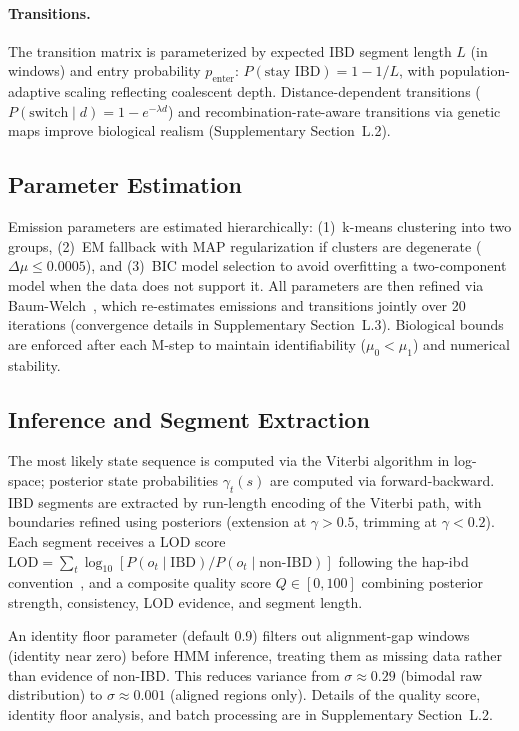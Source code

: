 \paragraph{Transitions.}
The transition matrix is parameterized by expected IBD segment length $L$ (in windows) and entry probability $p_{\text{enter}}$: $P(\text{stay IBD}) = 1 - 1/L$, with population-adaptive scaling reflecting coalescent depth. Distance-dependent transitions ($P(\text{switch} \mid d) = 1 - e^{-\lambda d}$) and recombination-rate-aware transitions via genetic maps improve biological realism (Supplementary Section~L.2).

\subsection{Parameter Estimation}

Emission parameters are estimated hierarchically: (1)~k-means clustering into two groups, (2)~EM fallback with MAP regularization if clusters are degenerate ($\Delta\mu \leq 0.0005$), and (3)~BIC model selection to avoid overfitting a two-component model when the data does not support it. All parameters are then refined via Baum-Welch~\cite{baum1970maximization}, which re-estimates emissions and transitions jointly over 20 iterations (convergence details in Supplementary Section~L.3). Biological bounds are enforced after each M-step to maintain identifiability ($\mu_0 < \mu_1$) and numerical stability.

\subsection{Inference and Segment Extraction}

The most likely state sequence is computed via the Viterbi algorithm in log-space; posterior state probabilities $\gamma_t(s)$ are computed via forward-backward. IBD segments are extracted by run-length encoding of the Viterbi path, with boundaries refined using posteriors (extension at $\gamma > 0.5$, trimming at $\gamma < 0.2$). Each segment receives a LOD score $\text{LOD} = \sum_{t} \log_{10} [P(o_t \mid \text{IBD}) / P(o_t \mid \text{non-IBD})]$ following the hap-ibd convention~\cite{browning2020hap_ibd}, and a composite quality score $Q \in [0, 100]$ combining posterior strength, consistency, LOD evidence, and segment length.

An identity floor parameter (default 0.9) filters out alignment-gap windows (identity near zero) before HMM inference, treating them as missing data rather than evidence of non-IBD. This reduces variance from $\sigma \approx 0.29$ (bimodal raw distribution) to $\sigma \approx 0.001$ (aligned regions only). Details of the quality score, identity floor analysis, and batch processing are in Supplementary Section~L.2.

